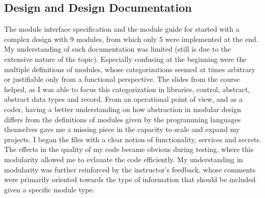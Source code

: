 \documentclass{article}
\begin{document}
\subsection{Design and Design Documentation}
The module interface specification and the module guide for \progname{}  started with a 
complex design with 9 modules, from which only 5 were implemented at the end. 
My understanding of such documentation was limited (still is due to the extensive nature of the
topic). Especially confusing at the beginning were the multiple definitions of modules, whose categorizations 
seemed at times arbitrary or justifiable only from a functional perspective. The slides from the course helped, 
as I was able to focus this categorization in libraries, control, abstract, abstract data types and 
record. From an operational point of view, and as a coder, having a better understanding on how abstraction 
in modular design differs from the definitions of modules given by the programming languages themselves gave me a missing 
piece in the capacity to scale and expand my projects. I began the files with a clear notion of 
functionality, services and secrets. The effects in the quality of my code became obvious during testing, where 
this modularity allowed me to evlauate the code efficiently.
My understanding in modularity was further reinforced by the instructor's feedback, whose comments were primarily oriented towards the type of 
information that should be included given a specific module type.
\end{document}
